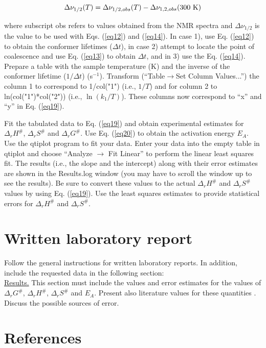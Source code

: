 \documentclass[byrevtex,amssymb,aps,pra,floatfix,letterpaper]{revtex4}
\begin{document}
\begin{equation}
\Delta\nu_{1/2}(T) = \Delta\nu_{1/2,obs}(T) - \Delta\nu_{1,2,obs}(\textnormal{300 K})
\label{eq21}
\end{equation}

\noindent
where subscript obs refers to values obtained from the NMR spectra and $\Delta\nu_{1/2}$ is the value to be used with Eqs. (\ref{eq12}) and (\ref{eq14}). In case 1), use Eq. (\ref{eq12}) to obtain the conformer lifetimes ($\Delta t$), in case 2) attempt to locate the point of coalescence and use Eq. (\ref{eq13}) to obtain $\Delta t$, and in 3) use the Eq. (\ref{eq14}). Prepare a table with the sample temperature (K) and the inverse of the conformer lifetime ($1 / \Delta t$) (s$^{-1}$). Transform (``Table$\rightarrow$Set Column Values...'') the column 1 to correspond to 1/col("1") (i.e., $1/T$) and for column 2 to ln(col("1")*col("2")) (i.e., $\ln(k_1/T)$). These columns now correspond to ``x'' and ``y'' in Eq. (\ref{eq19}).

Fit the tabulated data to Eq. (\ref{eq19}) and obtain experimental estimates for $\Delta_rH^\#$, $\Delta_rS^\#$ and $\Delta_rG^\#$. Use Eq. (\ref{eq20}) to obtain the activation energy $E_A$. Use the qtiplot program to fit your data. Enter your data into the empty table in qtiplot and choose ``Analyze $\rightarrow$ Fit Linear'' to perform the linear least squares fit. The results (i.e., the slope and the intercept) along with their error estimates are shown in the Results.log window (you may have to scroll the window up to see the results). Be sure to convert these values to the actual $\Delta_rH^\#$ and $\Delta_rS^\#$ values by using Eq. (\ref{eq19}). Use the least squares estimates to provide statistical errors for $\Delta_rH^\#$ and $\Delta_rS^\#$.

\section{Written laboratory report}

Follow the general instructions for written laboratory reports. In addition, include the requested data in the following section:\\

\noindent
\underline{Results.} This section must include the values and error estimates for the values of $\Delta_rG^\#$, $\Delta_rH^\#$, $\Delta_rS^\#$ and $E_A$. Present also literature values for these quantities \cite{JONAS}. Discuss the possible sources of error.

\section{References}

\vspace{-1cm}


\end{document}
